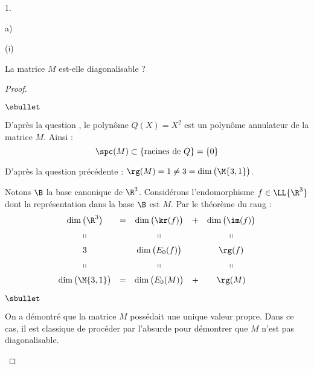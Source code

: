 \documentclass[11pt]{article}%
\begin{document}
\begin{noliste}{1.}
\begin{noliste}{a)}
\begin{nonoliste}{(i)}
    \item La matrice $M$ est-elle diagonalisable ?

      \begin{proof}~%
        \begin{noliste}{$\sbullet$}
        \item D'après la question , le polynôme $Q(X) =
          X^2$ est un polynôme annulateur de la matrice $M$. Ainsi :
          \[
          \spc(M) \subset \{\text{racines de $Q$}\} = \{0\}
          \]

        \item D'après la question précédente : $\rg(M) = 1 \neq 3 =
          \dim\big( \M{3,1} \big)$. %

        \item Notons $\B$ la base canonique de $\R^3$. Considérons
          l'endomorphisme $f \in \LL{\R^3}$ dont la représentation
          dans la base $\B$ est $M$. Par le théorème du rang :
          \[
          \begin{array}{ccccc}
            \dim\big( \R^3 \big) & = & \dim\big( \kr(f) \big) & + &
            \dim\big( \im(f) \big)
            \\[.2cm]
            \shortparallel & & \shortparallel & & \shortparallel
            \\[.2cm]
            3 & & \dim\big(  E_0(f) \big) & & \rg(f)
            \\[.2cm]
            \shortparallel & & \shortparallel & & \shortparallel
            \\[.2cm]
            \dim\big( \M{3,1} \big) & = & \dim\big( E_0(M) \big) & + & 
            \rg(M)
          \end{array}
          \]
        \end{noliste}
        \begin{remarkL}{.98}
          \begin{noliste}{$\sbullet$}
          \item On a démontré que la matrice $M$ possédait une unique
            valeur propre. Dans ce cas, il est classique de procéder
            par l'absurde pour démontrer que $M$ n'est pas
            diagonalisable.


\end{noliste}
\end{remarkL}
\end{proof}
\end{nonoliste}
\end{noliste}
\end{noliste}
\end{document}
